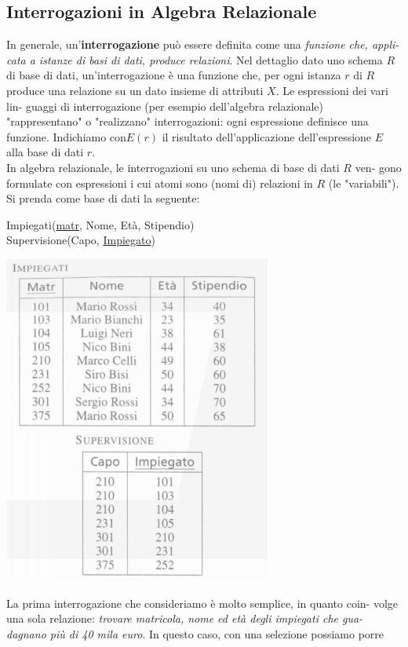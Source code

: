 \documentclass[a4paper,12pt, oneside]{book}
\begin{document}
\subsection{Interrogazioni in Algebra Relazionale}
In generale, un'\textbf{interrogazione} può essere definita come una\textit{ funzione che, appli-
  cata a istanze di basi di dati, produce relazioni}. Nel dettaglio dato uno schema $R$
di base di dati, un'interrogazione è una funzione che, per ogni istanza $r$ di $R$
produce una relazione su un dato insieme di attributi $X$. Le espressioni dei vari lin-
guaggi di interrogazione (per esempio dell'algebra relazionale) "rappresentano" o
"realizzano" interrogazioni: ogni espressione definisce una funzione. Indichiamo
con$ E(r)$ il risultato dell'applicazione dell'espressione $E$ alla base di dati $r$.\\
In algebra relazionale, le interrogazioni su uno schema di base di dati $R$ ven-
gono formulate con espressioni i cui atomi sono (nomi di) relazioni in $R$ (le "variabili").\\
Si prenda come base di dati la seguente:
\begin{center}
Impiegati(\underline{matr}, Nome, Età, Stipendio)\\
Supervisione(Capo, \underline{Impiegato})
\end{center}
\begin{center}
\includegraphics[scale=0.7]{img/int.png}
\end{center}
La prima interrogazione che consideriamo è molto semplice, in quanto coin-
volge una sola relazione: \textit{trovare matricola, nome ed età degli impiegati che gua-
dagnano più di 40 mila euro}. In questo caso, con una selezione possiamo porre
\end{document}
